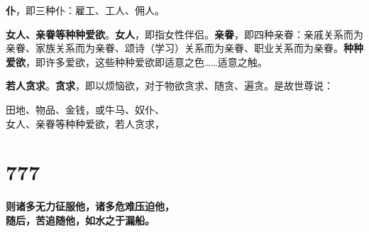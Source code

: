 
\textbf{仆}，即三种仆：雇工、工人、佣人。


\textbf{女人、亲眷等种种爱欲}。\textbf{女人}，即指女性伴侣。\textbf{亲眷}，即四种亲眷：亲戚关系而为亲眷、家族关系而为亲眷、颂诗（学习）关系而为亲眷、职业关系而为亲眷。\textbf{种种爱欲}，即许多爱欲，这些种种爱欲即适意之色……适意之触。


\textbf{若人贪求}。\textbf{贪求}，即以烦恼欲，对于物欲贪求、随贪、遍贪。是故世尊说：


\begin{quoting}田地、物品、金钱，或牛马、奴仆、\\女人、亲眷等种种爱欲，若人贪求，\end{quoting}


\section*{777}

\begin{quoting}\textbf{则诸多无力征服他，诸多危难压迫他，\\随后，苦追随他，如水之于漏船。}\end{quoting}

